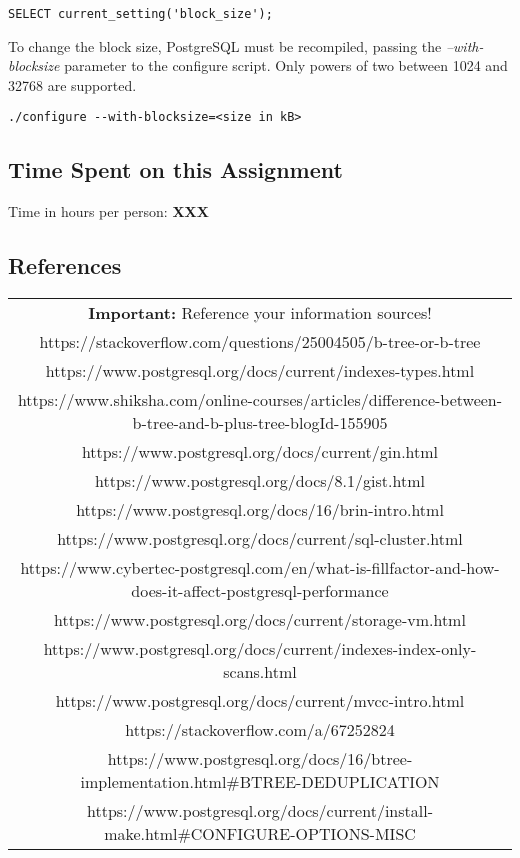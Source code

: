 \documentclass[11pt]{scrartcl}
\begin{document}
\begin{lstlisting}[style=dbtsql]
SELECT current_setting('block_size');
\end{lstlisting}

To change the block size, PostgreSQL must be recompiled, passing the \textit{--with-blocksize} parameter to the configure script. Only powers of two between 1024 and 32768 are supported.

\begin{lstlisting}
./configure --with-blocksize=<size in kB>
\end{lstlisting}

\subsection*{Time Spent on this Assignment}

Time in hours per person: \textbf{XXX}

\subsection*{References}

\begin{table}[H]
  \centering
  \begin{tabular}{c}
    \hline
    \textbf{Important:} Reference your information sources! \tabularnewline
    https://stackoverflow.com/questions/25004505/b-tree-or-b-tree \tabularnewline
    https://www.postgresql.org/docs/current/indexes-types.html \tabularnewline
    https://www.shiksha.com/online-courses/articles/difference-between-b-tree-and-b-plus-tree-blogId-155905 \tabularnewline
    https://www.postgresql.org/docs/current/gin.html \tabularnewline
    https://www.postgresql.org/docs/8.1/gist.html \tabularnewline
    https://www.postgresql.org/docs/16/brin-intro.html \tabularnewline
    https://www.postgresql.org/docs/current/sql-cluster.html \tabularnewline
    https://www.cybertec-postgresql.com/en/what-is-fillfactor-and-how-does-it-affect-postgresql-performance \tabularnewline
    https://www.postgresql.org/docs/current/storage-vm.html \tabularnewline
    https://www.postgresql.org/docs/current/indexes-index-only-scans.html \tabularnewline
    https://www.postgresql.org/docs/current/mvcc-intro.html \tabularnewline
    https://stackoverflow.com/a/67252824 \tabularnewline
    https://www.postgresql.org/docs/16/btree-implementation.html#BTREE-DEDUPLICATION \tabularnewline
    https://www.postgresql.org/docs/current/install-make.html#CONFIGURE-OPTIONS-MISC
    \hline
  \end{tabular}
\end{table}
\end{document}
